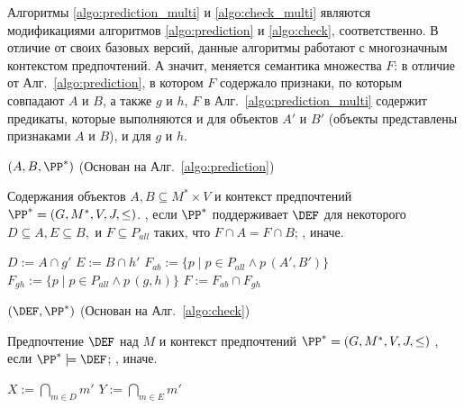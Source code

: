 	Алгоритмы \ref{algo:prediction_multi} и \ref{algo:check_multi} являются модификациями алгоритмов \ref{algo:prediction} и \ref{algo:check}, соответственно. В отличие от своих базовых версий, данные алгоритмы работают с многозначным контекстом предпочтений. А значит, меняется семантика множества $F$: в отличие от Алг.~\ref{algo:prediction}, в котором $F$ содержало признаки, по которым совпадают $A$ и $B$, а также $g$ и $h$, $F$ в Алг.~\ref{algo:prediction_multi} содержит предикаты, которые выполняются и для объектов $A'$ и $B'$ (объекты представлены признаками $A$ и $B$), и для $g$ и $h$.
	
	\begin{algorithm}
		\caption{$(A, B, \PP^*)$ (Основан на Алг.~\ref{algo:prediction})}
		\label{algo:prediction_multi}
		\begin{algorithmic}[1]
			\REQUIRE Содержания объектов $A, B \subseteq M^* \times V$ и контекст предпочтений $\PP^* = (G, M^*, V, J, \leq)$.
			\ENSURE \TRUE, если $\PP^*$ поддерживает $\DEF$ для некоторого $D \subseteq A, E \subseteq B,$ и $F \subseteq P_{all}$ таких, что $F \cap A = F \cap B$; \FALSE, иначе.
			\item[]
			\STATE $D := A \cap g'$
			\STATE $E := B \cap h'$
			\STATE $F_{ab} := \{p\;|\;p \in P_{all} \wedge p\,(A', B')\}$
			\STATE $F_{gh} := \{p\;|\;p \in P_{all} \wedge p\,(g, h)\}$
			\STATE $F := F_{ab} \cap F_{gh}$
			\IF{$\PP^* \models \DEF$}
			\RETURN \TRUE
			\ENDIF
			\ENDFOR
			\ENDFOR
			\RETURN \FALSE
		\end{algorithmic}
	\end{algorithm}
	
	\begin{algorithm}
		\caption{$(\DEF, \PP^*)$ (Основан на Алг.~\ref{algo:check})}
		\label{algo:check_multi}
		\begin{algorithmic}[1]
			\REQUIRE Предпочтение $\DEF$ над $M$ и контекст предпочтений $\PP^* = (G, M^*, V, J, \leq)$
			\ENSURE \TRUE, если $\PP^* \models \DEF$; \FALSE, иначе.
			\item[]
			\STATE $X := \bigcap_{m \in D}m'$
			\STATE $Y := \bigcap_{m \in E}m'$
			\FORALL{$g \in X$}
			\FORALL{$h \in Y$}
			\IF {$g \not\leq h$ \AND $\forall p \in F \; p\,(g, h)$}
			\RETURN \FALSE
			\ENDIF
			\ENDFOR
			\ENDFOR
			\RETURN \TRUE
		\end{algorithmic}
	\end{algorithm}